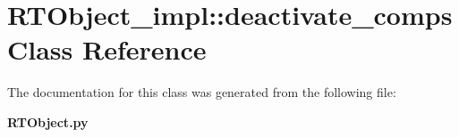 \section{RTObject\_\-impl::deactivate\_\-comps Class Reference}
\label{classRTObject__impl_1_1deactivate__comps}


The documentation for this class was generated from the following file:\begin{CompactItemize}
\item 
{\bf RTObject.py}\end{CompactItemize}
